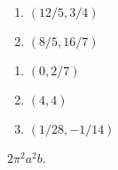\documentclass[11pt]{amsbook}
\begin{document}
\begin{hEnumerateArabic}
\begin{enumerate}[label=\alph*)]
    			\end{enumerate}	
               \setcounter{enumi}{55}
               \item
            		\begin{enumerate}[label=\alph*)]
				\item $(12/5 , 3/4)$
                        	\item $(8/5 , 16/7)$
    			\end{enumerate}
               \setcounter{enumi}{57}
               \item 
            		\begin{enumerate}[label=\alph*)]
				\item $(0 , 2/7)$
                  	        \item $(4 , 4)$
                   	        \item $(1/28 , -1/14)$
    			\end{enumerate}
              \setcounter{enumi}{59}
              \item $2\pi^2a^2b$. 
    \end{hEnumerateArabic}










\end{document}
